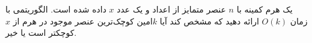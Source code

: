 یک هرم کمینه با $n$ عنصر متمایز از اعداد و یک عدد $x$ داده شده است. الگوریتمی با زمان $O(k)$ ارائه دهید که مشخص کند آیا $k$امین کوچک‌ترین عنصر موجود در هرم از $x$ کوچکتر است یا خیر.